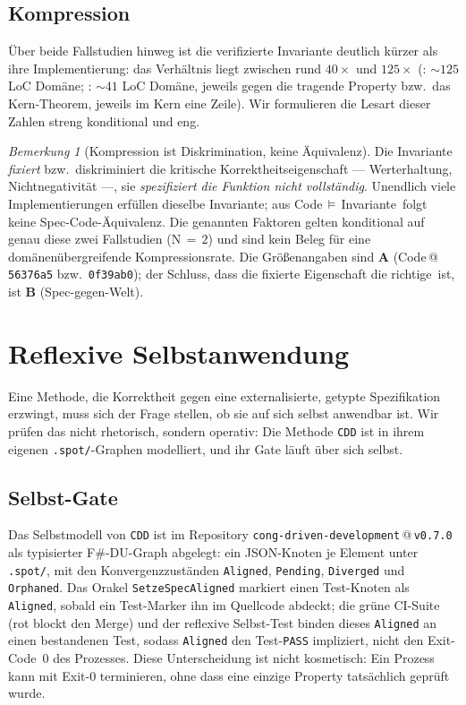 \documentclass[11pt,a4paper]{article}
\newcommand{\AB}[1]{\textbf{#1}}
\theoremstyle{definition}
\theoremstyle{remark}
\newtheorem{bemerkung}{Bemerkung}[section]
\begin{document}
\subsection{Kompression}
\label{sec:ledger-kompression}

Über beide Fallstudien hinweg ist die verifizierte Invariante deutlich kürzer als ihre
Implementierung: das Verhältnis liegt zwischen rund $40\times$ und $125\times$
(: $\sim\!125$ LoC Domäne; : $\sim\!41$ LoC Domäne, jeweils
gegen die tragende Property bzw.\ das Kern-Theorem, jeweils im Kern eine Zeile). Wir formulieren die Lesart dieser Zahlen
streng konditional und eng.

\begin{bemerkung}[Kompression ist Diskrimination, keine Äquivalenz]
\label{bem:kompression}
Die Invariante \emph{fixiert} bzw.\ diskriminiert die kritische Korrektheitseigenschaft ---
Werterhaltung, Nichtnegativität ---, sie \emph{spezifiziert die Funktion nicht vollständig}.
Unendlich viele Implementierungen erfüllen dieselbe Invariante; aus
\glqq Code\,$\models$\,Invariante\grqq\ folgt keine Spec-Code-Äquivalenz. Die genannten
Faktoren gelten konditional auf genau diese zwei Fallstudien (N\,$=$\,$2$) und sind kein Beleg
für eine domänenübergreifende Kompressionsrate. Die Größenangaben sind \AB{A}
(Code\,@\,\texttt{56376a5} bzw.\ \texttt{0f39ab0}); der Schluss, dass die fixierte Eigenschaft
\glqq die richtige\grqq\ ist, ist \AB{B} (Spec-gegen-Welt).
\end{bemerkung}

\section{Reflexive Selbstanwendung}
\label{sec:reflexiv}

Eine Methode, die Korrektheit gegen eine externalisierte, getypte Spezifikation
erzwingt, muss sich der Frage stellen, ob sie auf sich selbst anwendbar ist. Wir
prüfen das nicht rhetorisch, sondern operativ: Die Methode \texttt{CDD} ist in
ihrem eigenen \texttt{.spot/}-Graphen modelliert, und ihr Gate läuft über sich
selbst.

\subsection{Selbst-Gate}
\label{sec:reflexiv-selbstgate}

Das Selbstmodell von \texttt{CDD}
ist im Repository \texttt{cong-driven-development}\,@\,\texttt{v0.7.0} als typisierter
F\#-DU-Graph abgelegt: ein JSON-Knoten je Element unter \texttt{.spot/}, mit den
Konvergenzzuständen \texttt{Aligned}, \texttt{Pending}, \texttt{Diverged} und
\texttt{Orphaned}. Das Orakel \texttt{SetzeSpecAligned} markiert einen Test-Knoten
als \texttt{Aligned}, sobald ein Test-Marker ihn im Quellcode abdeckt; die grüne
CI-Suite (rot blockt den Merge) und der reflexive Selbst-Test binden dieses
\texttt{Aligned} an einen bestandenen Test, sodass \texttt{Aligned} den Test-\texttt{PASS}
impliziert, nicht den Exit-Code~0 des Prozesses. Diese Unterscheidung ist nicht kosmetisch:
Ein Prozess kann mit Exit-0 terminieren, ohne dass eine einzige Property tatsächlich geprüft wurde.
\end{document}
